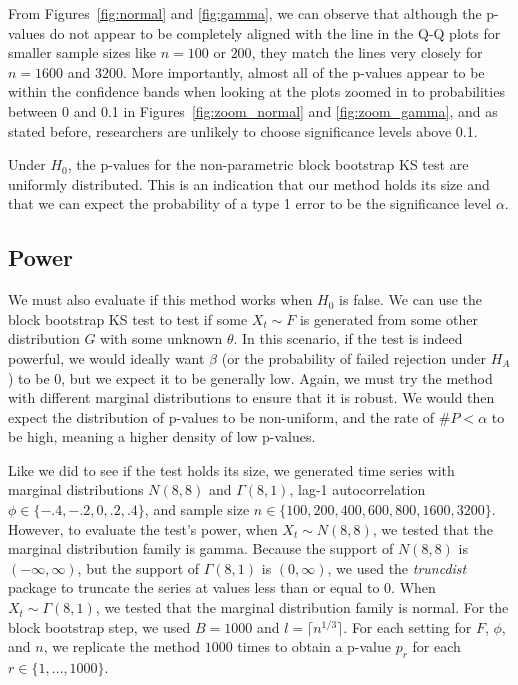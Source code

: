 \documentclass[12pt, titlepage, letterpaper]{article}
\begin{document}
{From Figures~\ref{fig:normal} and \ref{fig:gamma}, we can observe that 
although the p-values do not appear to be 
completely aligned with the line
in the Q-Q plots for smaller sample sizes like $n = 100$ or $200$, they match
the lines very closely for $n = 1600$ and $3200$. More importantly, almost
all of the p-values appear to be within the confidence bands when looking at the
plots zoomed in to probabilities between 0 and 0.1 in 
Figures~\ref{fig:zoom_normal} and \ref{fig:zoom_gamma}, and as stated 
before, 
researchers are unlikely to choose significance levels above 0.1. 


Under $H_0$, the p-values for the non-parametric block bootstrap KS test are
uniformly distributed. This is an indication that our method 
holds its size and that we can expect the probability
of a type 1 error to be the significance level $\alpha$.


\subsection{Power}
We must also evaluate if this method works when $H_0$ is false. We can use
the block bootstrap KS test to test if some $X_t \sim F$ is generated from 
some other 
distribution $G$ with some unknown $\theta$. In this scenario, if the test is 
indeed powerful,
we would ideally want $\beta$ 
(or the probability of failed rejection under $H_A$) 
to be 0, but we
expect it to be generally low. Again, we must try the method with different
marginal distributions to ensure that it is robust.
We would then expect the distribution of p-values to be non-uniform, and the 
rate
of $\#P < \alpha$ to be high, meaning a higher density of low p-values.


Like we did to see if the test holds its size, we generated time series with 
marginal distributions $N(8, 8)$ and 
$\Gamma(8, 1)$, lag-1 autocorrelation $\phi \in \{-.4, -.2, 0, .2, .4\}$, and
sample size $n \in \{100, 200, 400, 600, 800, 1600, 3200\}$. However, 
to evaluate the test's power, when $X_t \sim N(8, 8)$, we tested that the 
marginal distribution family is gamma. Because the support of $N(8, 8)$ is
$(-\infty, \infty)$, but the support of $\Gamma(8, 1)$ is $(0, \infty)$, we used
the \textsl{truncdist} package \citep{truncdist} to truncate the series at 
values less than or equal to 0.
When $X_t \sim \Gamma(8, 1)$, we tested
that the marginal distribution family is normal. For the block bootstrap step,
we used $B = 1000$ and $l = \lceil n^{1/3} \rceil$.
For each setting for $F$, $\phi$, and $n$, we replicate the method $1000$ times 
to obtain a p-value $p_r$ for each $r \in \{1, \ldots, 1000\}$.


}
\end{document}
